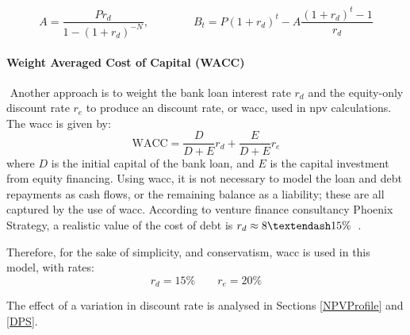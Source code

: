 \documentclass{report_template_oxford}
\begin{document}
\begin{equation}
    A=\frac{Pr_d}{1-(1+r_d)^{-N}}, \qquad\qquad B_t=P(1+r_d)^t-A\frac{(1+r_d)^t-1}{r_d}
    \label{equ:amortisation}
\end{equation}




\paragraph{Weight Averaged Cost of Capital (WACC)} \(\) \newline
Another approach is to weight the bank loan interest rate \(r_d\) and the equity-only discount rate \(r_e\) to produce an  discount rate, or \gls{wacc}, used in \gls{npv} calculations. The \gls{wacc} is given by:
\begin{equation}
    \text{WACC}=\frac{D}{D+E}r_d+\frac{E}{D+E}r_e
\end{equation}
where \(D\) is the initial capital of the bank loan, and \(E\) is the capital investment from equity financing. Using \gls{wacc}, it is not necessary to model the loan and debt repayments as cash flows, or the remaining balance as a liability; these are all captured by the use of \gls{wacc}. According to venture finance consultancy Phoenix Strategy, a realistic value of the cost of debt is \(r_d\approx 8\textendash 15\%\)~\cite{CostOfDebt}.\newline

\noindent Therefore, for the sake of simplicity, and conservatism, \gls{wacc} is used in this model, with rates:
\begin{equation}
    r_d=15\% \qquad r_e=20\%
\end{equation}

\noindent The effect of a variation in discount rate is analysed in Sections \ref{NPVProfile} and \ref{DPS}.
\end{document}
